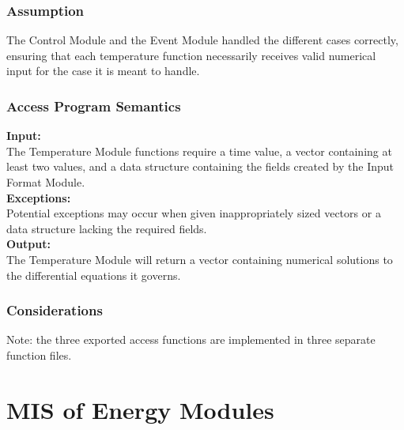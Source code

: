 \documentclass[12pt]{article}
\begin{document}

\subsubsection{Assumption}
The Control Module and the Event Module handled the different cases correctly,
 ensuring that each temperature function necessarily receives valid numerical input 
  for the case it is meant to handle.


\subsubsection{Access Program Semantics}

\noindent \textbf{Input:}\\
The Temperature Module functions require a time value, a vector containing at 
least two values, and a data structure containing the fields created by the 
Input Format Module. \\

\noindent \textbf{Exceptions:}\\
Potential exceptions may occur when given inappropriately sized
vectors or a data structure lacking the required fields.\\

\noindent \textbf{Output:}\\
The Temperature Module will return a vector containing numerical solutions to
the differential equations it governs. \\

\subsubsection{Considerations}
Note: the three exported access functions are implemented in three separate function files. 


\section{MIS of Energy Modules}
\end{document}
